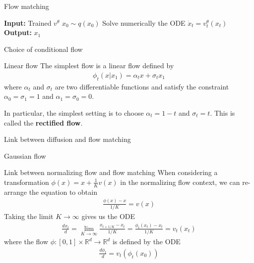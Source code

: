 \documentclass{beamer}
\begin{document}
\begin{frame}{Flow matching}
    \begin{algorithm}[H]
        \caption{Flow matching sampling}\label{alg:flow_matching_sampling}
            \begin{algorithmic}
                \State \textbf{Input:} Trained \(v^\theta\)
                \State \(x_0\sim q(x_0)\)
                \State Solve numerically the ODE \(\dot{x}_t=v_t^\theta(x_t)\)
                \State \textbf{Output:} \(x_1\)
            \end{algorithmic}
    \end{algorithm}
\end{frame}

\begin{frame}{Choice of conditional flow}
    \begin{block}{Linear flow}
        The simplest flow is a linear flow defined by
        \begin{align}
            \phi_t(x|x_1)=\alpha_t x+\sigma_t x_1
        \end{align}
        where \(\alpha_t\) and \(\sigma_t\) are two differentiable functions and satisfy the constraint \(\alpha_0=\sigma_1=1\) and \(\alpha_1=\sigma_0=0\).

        \bigskip
        In particular, the simplest setting is to choose \(\alpha_t=1-t \) and \(\sigma_t=t\). This is called the \textbf{rectified flow}.
    \end{block}
\end{frame}

\begin{frame}{Link between diffusion and flow matching}
    \begin{block}{Gaussian flow}

        
    \end{block}
\end{frame}

\begin{frame}{Link between normalizing flow and flow matching}
    When considering a transformation \(\phi(x)=x+\frac{1}{K}v(x)\) in the normalizing flow context, we can re-arrange the equation to obtain
    \begin{align*}
        \frac{\phi(x)-x}{1/K}=v(x)
    \end{align*}
    Taking the limit \(K\rightarrow \infty\) gives us the ODE
    \begin{align*}
        \frac{dx_t}{d}=\lim_{K\rightarrow \infty}\frac{x_{t+1/K}-x_t}{1/K}=\frac{\phi_t(x_t)-x_t}{1/K}=v_t(x_t)
    \end{align*} 
    where the flow \( \phi:[0,1]\times\mathbb{R}^d\rightarrow\mathbb{R}^d\) is defined by the ODE
    \begin{align*}
        \frac{d\phi_t}{d}=v_t(\phi_t(x_0))
    \end{align*}
\end{frame}
\end{document}
